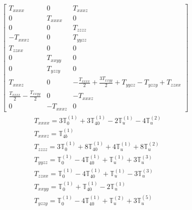 \documentclass[fleqn,8pt,landscape]{jsarticle}
\begin{document}
\begin{align*}
\begin{bmatrix} T_{xxxx} & 0 & T_{xxxz} \\ 0 & T_{xxxx} & 0 \\ 0 & 0 & T_{zzzz} \\ - T_{xxxz} & 0 & T_{yyzz} \\ T_{zzxx} & 0 & 0 \\ 0 & T_{xxyy} & 0 \\ 0 & T_{yzzy} & 0 \\ T_{xxxz} & 0 & - \frac{T_{xxxx}}{2} + \frac{3 T_{xxyy}}{2} + T_{yyzz} - T_{yzzy} + T_{zzxx} \\ \frac{T_{xxxx}}{2} - \frac{T_{xxyy}}{2} & 0 & - T_{xxxz} \\ 0 & - T_{xxxz} & 0 \end{bmatrix}
\end{align*}
\begin{align*}
& T_{xxxx} = 3 \mathbb{T}_{0}^{(1)} + 3 \mathbb{T}_{40}^{(1)} - 2 \mathbb{T}_{u}^{(1)} - 4 \mathbb{T}_{u}^{(2)} \\
& T_{xxxz} = \mathbb{T}_{4b}^{(1)} \\
& T_{zzzz} = 3 \mathbb{T}_{0}^{(1)} + 8 \mathbb{T}_{40}^{(1)} + 4 \mathbb{T}_{u}^{(1)} + 8 \mathbb{T}_{u}^{(2)} \\
& T_{yyzz} = \mathbb{T}_{0}^{(1)} - 4 \mathbb{T}_{40}^{(1)} + \mathbb{T}_{u}^{(1)} + 3 \mathbb{T}_{u}^{(3)} \\
& T_{zzxx} = \mathbb{T}_{0}^{(1)} - 4 \mathbb{T}_{40}^{(1)} + \mathbb{T}_{u}^{(1)} - 3 \mathbb{T}_{u}^{(3)} \\
& T_{xxyy} = \mathbb{T}_{0}^{(1)} + \mathbb{T}_{40}^{(1)} - 2 \mathbb{T}_{u}^{(1)} \\
& T_{yzzy} = \mathbb{T}_{0}^{(1)} - 4 \mathbb{T}_{40}^{(1)} + \mathbb{T}_{u}^{(2)} + 3 \mathbb{T}_{u}^{(5)}
\end{align*}
\end{document}
